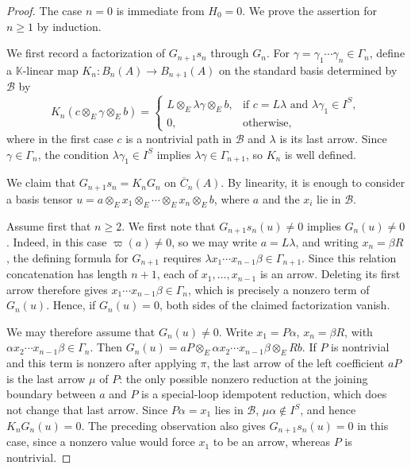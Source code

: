 \documentclass[11pt,a4paper,reqno]{amsart}
\newcommand{\mK}{\mathbb K}
\newcommand{\mB}{\mathcal B}
\theoremstyle{plain}
\theoremstyle{definition}
\numberwithin{equation}{section}
\begin{document}
	\begin{proof}
		The case $n=0$ is immediate from $H_0=0$.  We prove the assertion for
		$n\geq1$ by induction.
		
		We first record a factorization of $G_{n+1}s_n$ through $G_n$.  For
		$\gamma=\gamma_1\cdots\gamma_n\in\Gamma_n$, define a $\mK$-linear map
		$K_n:B_n(A)\to B_{n+1}(A)$ on the standard basis determined by $\mB$ by
		\[
		K_n(c\otimes_E\gamma\otimes_E b)
		=
		\begin{cases}
			L\otimes_E\lambda\gamma\otimes_E b,
			& \text{if } c=L\lambda\text{ and }\lambda\gamma_1\in I^S,\\
			0, & \text{otherwise},
		\end{cases}
		\]
		where in the first case $c$ is a nontrivial path in $\mB$ and $\lambda$
		is its last arrow.  Since $\gamma\in\Gamma_n$, the condition
		$\lambda\gamma_1\in I^S$ implies $\lambda\gamma\in\Gamma_{n+1}$, so
		$K_n$ is well defined.
		
		We claim that $G_{n+1}s_n=K_nG_n$ on $\overline C_n(A)$.  By linearity,
		it is enough to consider a basis tensor
		$u=a\otimes_E x_1\otimes_E\cdots\otimes_E x_n\otimes_E b$, where
		$a$ and the $x_i$ lie in $\mB$.
		
		Assume first that $n\geq2$.  We first note that
		$G_{n+1}s_n(u)\neq0$ implies $G_n(u)\neq0$.  Indeed, in this case
		$\varpi(a)\neq0$, so we may write $a=L\lambda$, and writing
		$x_n=\beta R$, the defining formula for $G_{n+1}$ requires
		$\lambda x_1\cdots x_{n-1}\beta\in\Gamma_{n+1}$.
		Since this relation concatenation has length $n+1$, each of
		$x_1,\ldots,x_{n-1}$ is an arrow.  Deleting its first arrow therefore gives
		$x_1\cdots x_{n-1}\beta\in\Gamma_n$, which is precisely a nonzero term of
		$G_n(u)$.  Hence, if $G_n(u)=0$, both sides of the claimed factorization
		vanish.
		
		We may therefore assume that $G_n(u)\neq0$.  Write
		$x_1=P\alpha$, $x_n=\beta R$, with
		$\alpha x_2\cdots x_{n-1}\beta\in\Gamma_n$.  Then
		$G_n(u)=aP\otimes_E\alpha x_2\cdots x_{n-1}\beta\otimes_E Rb$.
		If $P$ is nontrivial and this term is nonzero after applying $\pi$, the last arrow of the left coefficient $aP$ is the last
		arrow $\mu$ of $P$: the only possible nonzero reduction at the joining
		boundary between $a$ and $P$ is a special-loop idempotent reduction, which
		does not change that last arrow. Since $P\alpha=x_1$ lies in $\mB$,
		$\mu\alpha\notin I^S$, and hence $K_nG_n(u)=0$. The preceding observation
		also gives $G_{n+1}s_n(u)=0$ in this case, since a nonzero value would force
		$x_1$ to be an arrow, whereas $P$ is nontrivial.
		

\end{proof}
\end{document}
